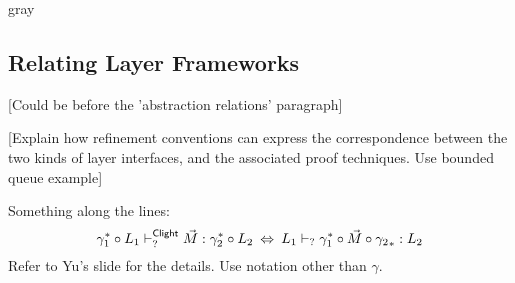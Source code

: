 \documentclass[acmsmall,review,anonymous]{acmart}\settopmatter{printfolios=true,printccs=false,printacmref=false}
\begin{document}


\begin{color}{gray}
\subsection{Relating Layer Frameworks} %
\label{sec:cal:relating}

[Could be before the 'abstraction relations' paragraph]

[Explain how refinement conventions
can express the correspondence between
the two kinds of layer interfaces,
and the associated proof techniques.
Use bounded queue example]


Something along the lines:
\[
  \gamma_1^* \circ L_1 \vdash^{ \mathsf{Clight} }_? \vec{M} : \gamma_2^* \circ L_2
  \:\Leftrightarrow\:
  L_1 \vdash_? \gamma_1^* \circ \vec{M} \circ {\gamma_2}_* : L_2
\]
Refer to Yu's slide for the details.
Use notation other than $\gamma$.

\end{color}


\end{document}
